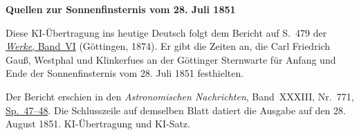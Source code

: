 \clearpage\thispagestyle{empty}
\begin{center}\textbf{Quellen zur Sonnenfinsternis vom 28. Juli 1851}\end{center}
\noindent Diese KI-Übertragung ins heutige Deutsch folgt dem Bericht auf S.~479 der \href{https://gdz.sub.uni-goettingen.de/id/PPN236007467}{\textit{Werke}, Band~VI} (Göttingen, 1874). Er gibt die Zeiten an, die Carl Friedrich Gauß, Westphal und Klinkerfues an der Göttinger Sternwarte für Anfang und Ende der Sonnenfinsternis vom 28. Juli 1851 festhielten.
\par\smallskip\noindent Der Bericht erschien in den \textit{Astronomischen Nachrichten}, Band~XXXIII, Nr.~771, \href{https://api.digitale-sammlungen.de/iiif/image/v2/bsb10049458_00030/full/1800,/0/default.jpg}{Sp.~47--48}. Die Schlusszeile auf demselben Blatt datiert die Ausgabe auf den 28. August 1851. KI-Übertragung und KI-Satz.
\clearpage

